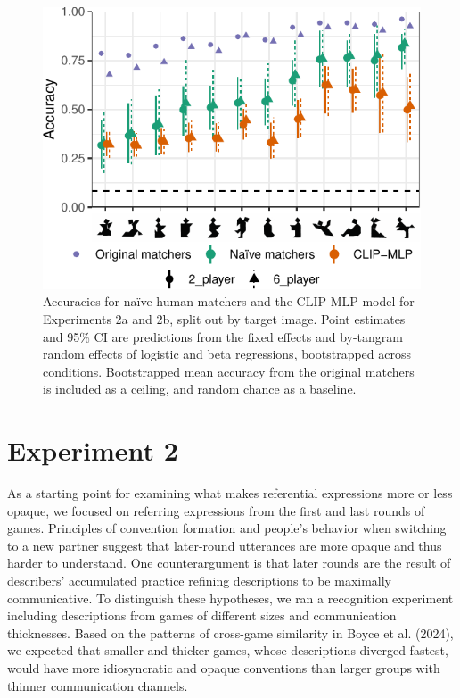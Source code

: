 \documentclass[10pt, letterpaper]{article}
\begin{document}
\begin{CodeChunk}
\begin{figure}[t]

{\centering \includegraphics[width=0.9\linewidth]{figs/fig-2-1} 

}

\caption[Accuracies for naïve human matchers and the CLIP-MLP model for Experiments 2a and 2b, split out by target image]{Accuracies for naïve human matchers and the CLIP-MLP model for Experiments 2a and 2b, split out by target image. Point estimates and 95\% CI are predictions from the fixed effects and by-tangram random effects of logistic and beta regressions, bootstrapped across conditions. Bootstrapped mean accuracy from the original matchers is included as a ceiling, and random chance as a baseline. \label{expt2-tangram}}\label{fig:fig-2}
\end{figure}
\end{CodeChunk}

\section{Experiment 2}\label{experiment-2}

As a starting point for examining what makes referential expressions
more or less opaque, we focused on referring expressions from the first
and last rounds of games. Principles of convention formation and
people's behavior when switching to a new partner suggest that
later-round utterances are more opaque and thus harder to understand.
One counterargument is that later rounds are the result of describers'
accumulated practice refining descriptions to be maximally
communicative. To distinguish these hypotheses, we ran a recognition
experiment including descriptions from games of different sizes and
communication thicknesses. Based on the patterns of cross-game
similarity in Boyce et al. (2024), we expected that smaller and thicker
games, whose descriptions diverged fastest, would have more
idiosyncratic and opaque conventions than larger groups with thinner
communication channels.
\end{document}

